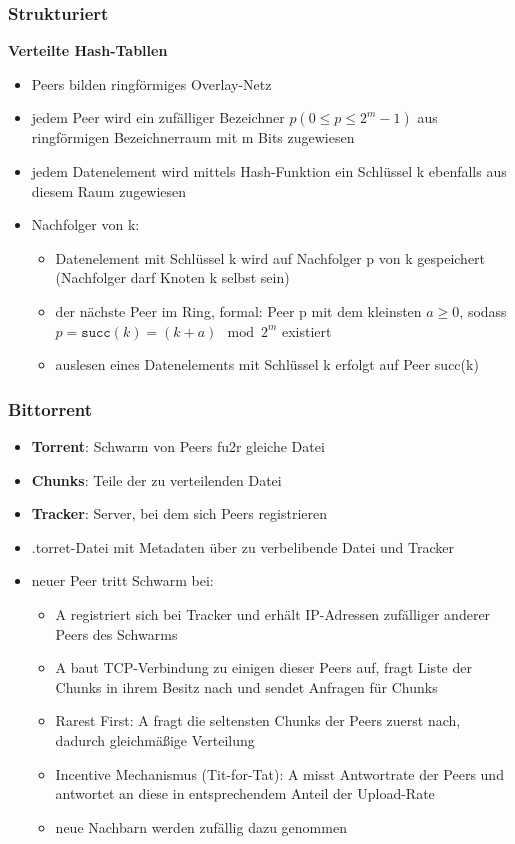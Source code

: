 		\subsubsection{Strukturiert}
			\textbf{Verteilte Hash-Tabllen}
			\begin{itemize}
  				\item Peers bilden ringförmiges Overlay-Netz
  				\item jedem Peer wird ein zufälliger Bezeichner $p(0\leq p\leq 2^m-1)$ aus ringförmigen Bezeichnerraum mit m Bits zugewiesen
  				\item jedem Datenelement wird mittels Hash-Funktion ein Schlüssel k ebenfalls aus diesem Raum zugewiesen
  				\item Nachfolger von k:
  					\begin{itemize}
  						\item Datenelement mit Schlüssel k wird auf Nachfolger p von k gespeichert (Nachfolger darf Knoten k selbst sein)
  						\item der nächste Peer im Ring, formal: Peer p mit dem kleinsten $a\geq0$, sodass $p=\texttt{succ}(k)=(k+a)\mod2^m$ existiert
  						\item auslesen eines Datenelements mit Schlüssel k erfolgt auf Peer succ(k)
					\end{itemize}
			\end{itemize}
		\subsubsection{Bittorrent}
			\begin{itemize}
				\item \textbf{Torrent}: Schwarm von Peers fu2r gleiche Datei
				\item \textbf{Chunks}: Teile der zu verteilenden Datei
				\item \textbf{Tracker}: Server, bei dem sich Peers registrieren
				\item .torret-Datei mit Metadaten über zu verbelibende Datei und Tracker
				\item neuer Peer tritt Schwarm bei:
					\begin{itemize}
						 \item A registriert sich bei Tracker und erhält IP-Adressen zufälliger anderer Peers des Schwarms
						 \item A baut TCP-Verbindung zu einigen dieser Peers auf, fragt Liste der Chunks in ihrem Besitz nach und sendet Anfragen für Chunks
						 \item Rarest First: A fragt die seltensten Chunks der Peers zuerst nach, dadurch gleichmäßige Verteilung
						 \item Incentive Mechanismus (Tit-for-Tat): A misst Antwortrate der Peers und antwortet an diese in entsprechendem Anteil der Upload-Rate
						 \item neue Nachbarn werden zufällig dazu genommen
					\end{itemize}

			\end{itemize}


				





			
			
			
